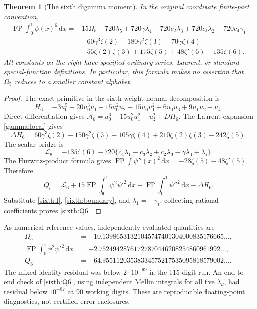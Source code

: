 \documentclass[11pt,a4paper]{article}
\numberwithin{equation}{section}
\newtheorem{theorem}{Theorem}[section]
\theoremstyle{definition}
\theoremstyle{remark}
\DeclareMathOperator{\FP}{FP}
\newcommand{\dd}{\,\mathrm d}
\newcommand{\A}{\mathcal A}
\begin{document}
\begin{theorem}[The sixth digamma moment]
\label{sixth:main}
In the original coordinate finite-part convention,
\begin{equation}\label{sixth:Q6}
 \boxed{\begin{aligned}
 \FP\int_0^1\psi(x)^6\dd x={}&
 15\Omega_5-720\lambda_5+720\gamma\lambda_4
 -720c_2\lambda_3+720c_3\lambda_2+720c_4\gamma_1\\
 &-60\gamma^3\zeta(2)+180\gamma^2\zeta(3)-70\gamma\zeta(4)\\
 &-55\zeta(2)\zeta(3)+175\zeta(5)
                  +48\zeta'(5)-135\zeta(6).
 \end{aligned}}
\end{equation}
All constants on the right have specified ordinary-series, Laurent,
or standard special-function definitions.  In particular, this
formula makes no assertion that $\Omega_5$ reduces to a smaller
constant alphabet.
\end{theorem}
\begin{proof}
The exact primitive in the sixth-weight normal decomposition is
\begin{equation}\label{sixth:H6}
 H_6=-3u_0^5+20u_0^3u_1-15u_0^2u_2-15u_0u_1^2
                       +6u_0u_3+9u_1u_2-u_4.
\end{equation}
Direct differentiation gives
$\A_6=u_0^6-15u_0^2u_1^2+u_2^2+DH_6$.
The Laurent expansion \eqref{gamma:local} gives
\begin{equation}\label{sixth:boundary}
 \Delta H_6=60\gamma^3\zeta(2)-150\gamma^2\zeta(3)
 -105\gamma\zeta(4)+210\zeta(2)\zeta(3)-242\zeta(5).
\end{equation}
The scalar bridge is
\[
 \mathcal L_6=-135\zeta(6)
  -720\{c_4\lambda_1-c_3\lambda_2+c_2\lambda_3
                              -\gamma\lambda_4+\lambda_5\}.
\]
The Hurwitz-product formula gives
$\FP\int\psi''(x)^2\dd x=-28\zeta(5)-48\zeta'(5)$.
Therefore
\[
 Q_6=\mathcal L_6+15\FP\int_0^1\psi^2\psi'^2\dd x
                    -\FP\int_0^1\psi''^2\dd x-\Delta H_6.
\]
Substitute \eqref{sixth:I}, \eqref{sixth:boundary}, and
$\lambda_1=-\gamma_1$; collecting rational coefficients proves
\eqref{sixth:Q6}.
\end{proof}

As numerical reference values, independently evaluated quantities are
\begin{align*}
 \Omega_5&=-10.13986531321045747401304000835176665\ldots,\\
 \FP\int_0^1\psi^2\psi'^2\dd x
   &=-2.76249428761727870446208254860961992\ldots,\\
 Q_6&=-64.95511203538334575217535095818579002\ldots.
\end{align*}
The mixed-identity residual was below $2\cdot10^{-99}$ in the
115-digit run.  An end-to-end check of \eqref{sixth:Q6}, using
independent Mellin integrals for all five $\lambda_d$, had residual
below $10^{-87}$ at 90 working digits.  These are reproducible
floating-point diagnostics, not certified error enclosures.
\end{document}

